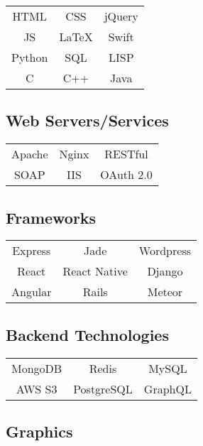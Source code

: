 \documentclass[letterpaper]{deedy-resume} %
\begin{document}
\begin{minipage}[t]{0.33\textwidth}
  \begin{tabular}{ c c c }
    HTML    & CSS    & jQuery \\
    JS      & \LaTeX & Swift    \\
    Python & SQL    & LISP   \\
    C       & C++    & Java \\
  \end{tabular}

  \vspace{4mm}

  \subsection{Web Servers/Services}

  \begin{tabular}{ c c c }
    Apache & Nginx & RESTful \\
    SOAP & IIS & OAuth 2.0
  \end{tabular}

  \vspace{4mm}

  \subsection{Frameworks}

  \begin{tabular}{ c c c }
    Express & Jade & Wordpress \\
    React & React Native & Django \\
    Angular & Rails & Meteor
  \end{tabular}

  \vspace{4mm}

  \subsection{Backend Technologies}

  \begin{tabular}{ c c c }
    MongoDB & Redis & MySQL \\
    AWS S3 & PostgreSQL & GraphQL
  \end{tabular}

  \vspace{4mm}

  \subsection{Graphics}


\end{minipage}
\end{document}
